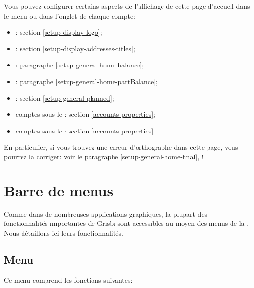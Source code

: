 Vous pouvez configurer certains aspects de l'affichage de cette page d'accueil dans le menu  ou dans l'onglet  de chaque compte:
\begin{itemize}
	 \item {}: section \vref{setup-display-logo};
	 \item {}: section \vref{setup-display-addresses-titles};
	 \item {}: paragraphe \vref{setup-general-home-balance};
	 \item {}: paragraphe \vref{setup-general-home-partBalance};
	 \item {}: section \vref{setup-general-planned};
	 \item comptes sous le : section \vref{accounts-properties};
	 \item comptes sous le : section \vref{accounts-properties}.
\end{itemize}

En particulier, si vous trouvez une erreur d’orthographe dans cette page, vous pourrez la corriger: voir le paragraphe \vref{setup-general-home-final}, !


\section{Barre de menus\label{home-menus}}


Comme dans de nombreuses applications graphiques, la plupart des fonctionnalités importantes de Grisbi sont accessibles au moyen des menus de la . Nous détaillons ici leurs fonctionnalités.


\subsection{Menu \label{home-menus-file}}

Ce menu comprend les fonctions suivantes:

